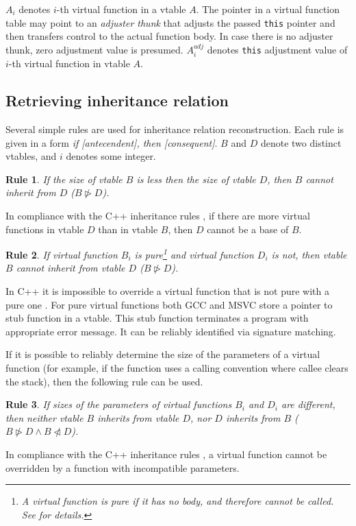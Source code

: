 \documentclass[10pt, conference]{IEEEtran}
\newcommand{\adj}{\textit{adj}}
\newcommand{\nlhd}{\ntriangleleft}
\newcommand{\nrhd}{\ntriangleright}
\newtheorem{rulez}{Rule}
\begin{document}
$A_i$ denotes $i$-th virtual function in a vtable $A$.
The pointer in a virtual function table may point to an \textit{adjuster thunk}
that adjusts the passed \lstinline{this} pointer and then transfers control
to the actual function body.
In case there is no adjuster thunk, zero adjustment value is presumed.
$A_i^{\adj}$ denotes \lstinline{this} adjustment value of $i$-th virtual function in vtable $A$.




\quad

\subsection{Retrieving inheritance relation}\label{chapterRetrieving}
Several simple rules are used for inheritance relation reconstruction.
Each rule is given in a form \textit{if [antecendent], then [consequent]}.
$B$ and $D$ denote two distinct vtables, and $i$ denotes some integer.

\begin{rulez}\label{stmt:first_good}\label{stmt:vtable_size}
If the size of vtable $B$ is less then the size of vtable $D$, then $B$ cannot inherit from $D$ ($B \nrhd D$).
\end{rulez}
In compliance with the C++ inheritance rules \cite{cpp03},
if there are more virtual functions in vtable $D$ than in vtable $B$,
then $D$ cannot be a base of $B$. %

\begin{rulez}\label{stmt:inherit_pure}
If virtual function $B_i$ is pure\footnote{A virtual function is pure if it has no body, and therefore cannot be called. See \cite{stroustrup97} for details.} and virtual function $D_i$ is not, then vtable $B$ cannot inherit from vtable $D$ ($B \nrhd D$).
\end{rulez}
In C++ it is impossible to override a virtual function that is not pure
with a pure one \cite{cpp03}. For pure virtual functions both GCC and MSVC 
store a pointer to stub function in a vtable.
This stub function terminates a program with appropriate error message.
It can be reliably identified via signature matching.

If it is possible to reliably determine the size of the parameters
of a virtual function (for example, if the function uses
a calling convention where callee clears the stack),
then the following rule can be used.
\begin{rulez}\label{stmt:param_size}
If sizes of the parameters of virtual functions $B_i$ and $D_i$ are different,
then neither vtable $B$ inherits from vtable $D$, nor $D$ inherits from $B$ ($B \nrhd D \wedge B \nlhd D$).
\end{rulez}
In compliance with the C++ inheritance rules \cite{cpp03},
a virtual function cannot be overridden by a function with incompatible parameters.
\end{document}

